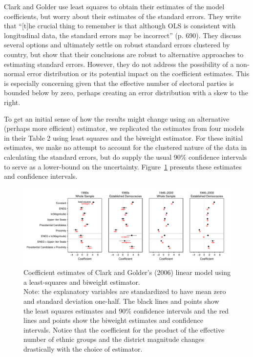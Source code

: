 \documentclass[12pt]{article}
\begin{document}
Clark and Golder use least squares to obtain their estimates of the model coefficients, but worry about their estimates of the standard errors. 
They write that ``[t]he crucial thing to remember is that although OLS is consistent with longitudinal data, the standard errors may be incorrect'' (p. 690). 
They discuss several options and ultimately settle on robust standard errors clustered by country, but show that their conclusions are robust to alternative approaches to estimating standard errors. 
However, they do not address the possibility of a non-normal error distribution or its potential impact on the coefficient estimates. 
This is especially concerning given that the effective number of electoral parties is bounded below by zero, perhaps creating an error distribution with a skew to the right. 

To get an initial sense of how the results might change using an alternative (perhaps more efficient) estimator, we replicated the estimates from four models in their Table 2 using least squares and the biweight estimator. 
For these initial estimates, we make no attempt to account for the clustered nature of the data in calculating the standard errors, but do supply the usual 90\% confidence intervals to serve as a lower-bound on the uncertainty. 
Figure~\ref{fig:cg-coef-plots} presents these estimates and confidence intervals.

\begin{figure}[h!]
\begin{center}
\includegraphics[scale = .8]{figs/cg-coef-plots.pdf}
\caption{Coefficient estimates of Clark and Golder's (2006) linear model using a least-squares and biweight estimator.\\
Note: the explanatory variables are standardized to have mean zero and standard deviation one-half. 
The black lines and points show the least squares estimates and 90\% confidence intervals and the red lines and points show the biweight estimates and confidence intervals. 
Notice that the coefficient for the product of the effective number of ethnic groups and the district magnitude changes drastically with the choice of estimator.}\label{fig:cg-coef-plots}
\end{center}
\end{figure}
\end{document}
